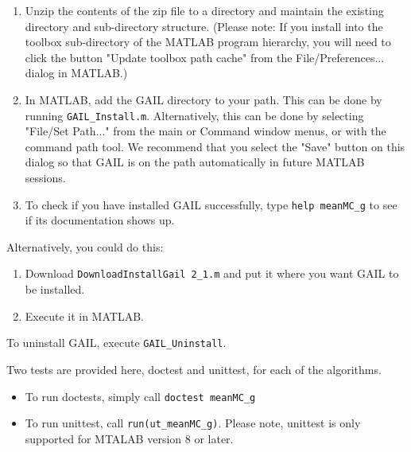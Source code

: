 \documentclass{iitthesis}
\theoremstyle{definition}
\begin{document}
\begin{enumerate}
\item Unzip the contents of the zip file to a directory and maintain the existing directory and sub-directory structure. (Please note: If you install into the toolbox sub-directory of the MATLAB program hierarchy, you will need to click the button "Update toolbox path cache" from the File/Preferences... dialog in MATLAB.)
\item In MATLAB, add the GAIL directory to your path. This can be done by running {\tt GAIL{\_}Install.m}. Alternatively, this can be done by selecting "File/Set Path..." from the main or Command window menus, or with the command path tool. We recommend that you select the "Save" button on this dialog so that GAIL is on the path automatically in future MATLAB sessions.
\item To check if you have installed GAIL successfully, type {\tt help meanMC\_g} to see if its documentation shows up.
\end{enumerate}

Alternatively, you could do this:
\begin{enumerate}
\item Download {\tt DownloadInstallGail 2\_1.m} and put it where you want GAIL to be installed.
\item Execute it in MATLAB.
\end{enumerate}

To uninstall GAIL, execute {\tt GAIL\_Uninstall}.

Two tests are provided here, doctest and unittest, for each of the algorithms.
\begin{itemize}
\item To run doctests, simply call {\tt doctest meanMC\_g}
\item To run unittest, call {\tt run(ut\_meanMC\_g)}. Please note, unittest is only supported for MTALAB version 8 or later.
\end{itemize}


\label{chapter:comclusion}
\end{document}
